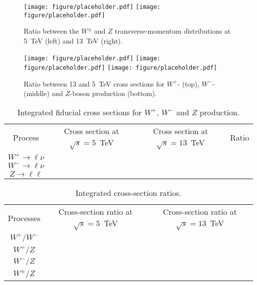 \begin{figure}[htbp]
  \centering
  \texttt{[image: figure/placeholder.pdf]}
  \texttt{[image: figure/placeholder.pdf]}
  \caption{Ratio between the $W^\pm$ and $Z$ transverse-momentum distributions at 5~TeV (left) and 13~TeV (right).}
  \label{fig:combiWp}
\end{figure}

\begin{figure}[htbp]
  \centering
  \texttt{[image: figure/placeholder.pdf]}
  \texttt{[image: figure/placeholder.pdf]}
  \texttt{[image: figure/placeholder.pdf]}
  \caption{Ratio between 13 and 5~TeV cross sections for $W^+$- (top), $W^-$- (middle) and $Z$-boson production (bottom).}
  \label{fig:combiWp}
\end{figure}

\begin{table}
  \centering
  \begin{tabular}{cccc}
    \toprule
    Process & Cross section at $\sqrt{s}=5$~TeV & Cross section at $\sqrt{s}=13$~TeV & Ratio  \\
    $W^+\to \ell\nu$ & &  \\
    $W^-\to \ell\nu$ & &  \\
    $Z\to \ell\ell$  & &  \\
    \bottomrule
  \end{tabular}
  \caption{Integrated fiducial cross sections for $W^+$, $W^-$ and $Z$ production.\label{tab:fidxsec}}
\end{table}

\begin{table}
  \centering
  \begin{tabular}{ccc}
    \toprule
    Processes & Cross-section ratio at $\sqrt{s}=5$~TeV & Cross-section ratio at $\sqrt{s}=13$~TeV  \\
    $W^+/W^-$ & &  \\
    $W^+/Z$ & &  \\
    $W^-/Z$  & &  \\
    $W^\pm/Z$  & &  \\
    \bottomrule
  \end{tabular}
  \caption{Integrated cross-section ratios.\label{tab:fidratios}}
\end{table}
